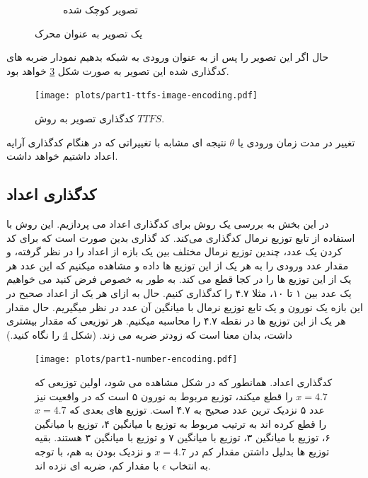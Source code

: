 \begin{figure}[htbp]
\begin{subfigure}[b]{0.45\textwidth}
                    \caption{تصویر کوچک شده}
                    \label{fig:waterloo-sample-resized}
                \end{subfigure}
                \caption{یک تصویر به عنوان محرک}
                \label{fig:waterloo-sample-image}
            \end{figure}
            حال اگر این تصویر را پس از  به عنوان ورودی به شبکه بدهیم نمودار ضربه های کدگذاری شده این تصویر به صورت شکل 
            \ref{fig:part1-ttfs-image-encoding}
            خواهد بود.
            \begin{figure}[!ht]
                \centering
                \texttt{[image: plots/part1-ttfs-image-encoding.pdf]} 
                \caption{کدگذاری تصویر به روش 
                $TTFS$. }
                \label{fig:part1-ttfs-image-encoding}
            \end{figure}

            تغییر در مدت زمان ورودی یا 
            $\theta$ 
            نتیجه ای مشابه با تغییراتی که در هنگام کدگذاری آرایه اعداد داشتیم خواهد داشت.

    \subsection{کدگذاری اعداد}
        در این بخش به بررسی یک روش برای کدگذاری اعداد می پردازیم. این روش با استفاده از تابع توزیع نرمال کدگذاری می‌کند. کد گذاری بدین صورت است که برای کد کردن یک عدد، چندین توزیع نرمال مختلف بین یک بازه از اعداد را در نظر گرفته، و مقدار عدد ورودی را به هر یک از این توزیع ها داده و مشاهده میکنیم که این عدد هر یک از این توزیع ها را در کجا قطع می کند. به طور به خصوص فرض کنید می خواهیم یک عدد بین ۱ تا ۱۰، مثلا ۴.۷ را کدگذاری کنیم. حال به ازای هر یک از اعداد صحیح در این بازه یک نورون و یک تابع توزیع نرمال با میانگین آن عدد در نظر میگیریم. حال مقدار هر یک از این توزیع ها در نقطه ۴.۷ را محاسبه میکنیم. هر توزیعی که مقدار بیشتری داشت، بدان معنا است که زودتر ضربه می زند. 
        (شکل 
        \ref{fig:part1-number-encoding}
        را نگاه کنید.)
        \begin{figure}[!ht]
            \centering
            \texttt{[image: plots/part1-number-encoding.pdf]} 
            \caption{کدگذاری اعداد. همانطور که در شکل مشاهده می شود، اولین توزیعی که  
            $x=4.7$
            را قطع میکند، توزیع مربوط به نورون ۵ است که در واقعیت نیز عدد ۵ نزدیک ترین عدد صحیح به ۴.۷ 
            است. توزیع های بعدی که  
            $x=4.7$
            را قطع کرده اند به ترتیب مربوط به توزیع با میانگین ۴، توزیع با میانگین ۶، توزیع با میانگین ۳، توزیع با میانگین ۷ و توزیع با میانگین ۳ هستند. بقیه توزیع ها بدلیل داشتن مقدار کم در 
            $x=4.7$ 
            و نزدیک بودن به هم، با توجه به انتخاب  
            $\epsilon$
            با مقدار کم، ضربه ای نزده اند.}
            \label{fig:part1-number-encoding}
        \end{figure}

